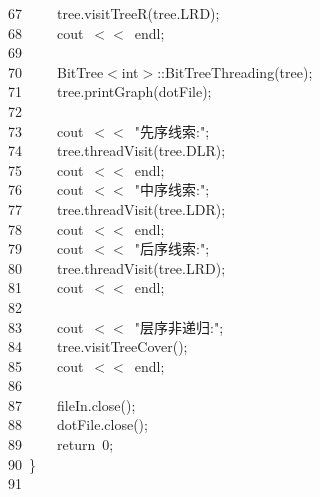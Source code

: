 \documentclass[11pt,a4paper]{ctexart}
\newcommand{\hlstd}[1]{\textcolor[rgb]{0.2,0.2,0.2}{#1}}
\newcommand{\hlnum}[1]{\textcolor[rgb]{0.06,0.58,0.63}{#1}}
\newcommand{\hlstr}[1]{\textcolor[rgb]{0.06,0.58,0.63}{#1}}
\newcommand{\hlopt}[1]{\textcolor[rgb]{0.2,0.2,0.2}{#1}}
\newcommand{\hllin}[1]{\textcolor[rgb]{0.59,0.59,0.59}{#1}}
\newcommand{\hlkwa}[1]{\textcolor[rgb]{0.23,0.42,0.78}{#1}}
\newcommand{\hlkwb}[1]{\textcolor[rgb]{0.63,0,0.31}{#1}}
\newcommand{\hlkwd}[1]{\textcolor[rgb]{0.78,0.23,0.41}{#1}}
\begin{document}
\hllin{67\ }\hlstd{}\hlstd{\ \ \ \ }\hlstd{tree}\hlopt{.}\hlstd{}\hlkwd{visitTreeR}\hlstd{}\hlopt{(}\hlstd{tree}\hlopt{.}\hlstd{LRD}\hlopt{);}\\
\hllin{68\ }\hlstd{}\hlstd{\ \ \ \ }\hlstd{cout\ }\hlopt{$<$$<$\ }\hlstd{endl}\hlopt{;}\\
\hllin{69\ }\hlstd{}\\
\hllin{70\ }\hlstd{}\hlstd{\ \ \ \ }\hlstd{BitTree}\hlopt{$<$}\hlstd{}\hlkwb{int}\hlstd{}\hlopt{$>$::}\hlstd{}\hlkwd{BitTreeThreading}\hlstd{}\hlopt{(}\hlstd{tree}\hlopt{);}\\
\hllin{71\ }\hlstd{}\hlstd{\ \ \ \ }\hlstd{tree}\hlopt{.}\hlstd{}\hlkwd{printGraph}\hlstd{}\hlopt{(}\hlstd{dotFile}\hlopt{);}\\
\hllin{72\ }\hlstd{}\\
\hllin{73\ }\hlstd{}\hlstd{\ \ \ \ }\hlstd{cout\ }\hlopt{$<$$<$\ }\hlstd{}\hlstr{"先序线索:"}\hlstd{}\hlopt{;}\\
\hllin{74\ }\hlstd{}\hlstd{\ \ \ \ }\hlstd{tree}\hlopt{.}\hlstd{}\hlkwd{threadVisit}\hlstd{}\hlopt{(}\hlstd{tree}\hlopt{.}\hlstd{DLR}\hlopt{);}\\
\hllin{75\ }\hlstd{}\hlstd{\ \ \ \ }\hlstd{cout\ }\hlopt{$<$$<$\ }\hlstd{endl}\hlopt{;}\\
\hllin{76\ }\hlstd{}\hlstd{\ \ \ \ }\hlstd{cout\ }\hlopt{$<$$<$\ }\hlstd{}\hlstr{"中序线索:"}\hlstd{}\hlopt{;}\\
\hllin{77\ }\hlstd{}\hlstd{\ \ \ \ }\hlstd{tree}\hlopt{.}\hlstd{}\hlkwd{threadVisit}\hlstd{}\hlopt{(}\hlstd{tree}\hlopt{.}\hlstd{LDR}\hlopt{);}\\
\hllin{78\ }\hlstd{}\hlstd{\ \ \ \ }\hlstd{cout\ }\hlopt{$<$$<$\ }\hlstd{endl}\hlopt{;}\\
\hllin{79\ }\hlstd{}\hlstd{\ \ \ \ }\hlstd{cout\ }\hlopt{$<$$<$\ }\hlstd{}\hlstr{"后序线索:"}\hlstd{}\hlopt{;}\\
\hllin{80\ }\hlstd{}\hlstd{\ \ \ \ }\hlstd{tree}\hlopt{.}\hlstd{}\hlkwd{threadVisit}\hlstd{}\hlopt{(}\hlstd{tree}\hlopt{.}\hlstd{LRD}\hlopt{);}\\
\hllin{81\ }\hlstd{}\hlstd{\ \ \ \ }\hlstd{cout\ }\hlopt{$<$$<$\ }\hlstd{endl}\hlopt{;}\\
\hllin{82\ }\hlstd{}\\
\hllin{83\ }\hlstd{}\hlstd{\ \ \ \ }\hlstd{cout\ }\hlopt{$<$$<$\ }\hlstd{}\hlstr{"层序非递归:"}\hlstd{}\hlopt{;}\\
\hllin{84\ }\hlstd{}\hlstd{\ \ \ \ }\hlstd{tree}\hlopt{.}\hlstd{}\hlkwd{visitTreeCover}\hlstd{}\hlopt{();}\\
\hllin{85\ }\hlstd{}\hlstd{\ \ \ \ }\hlstd{cout\ }\hlopt{$<$$<$\ }\hlstd{endl}\hlopt{;}\\
\hllin{86\ }\hlstd{}\\
\hllin{87\ }\hlstd{}\hlstd{\ \ \ \ }\hlstd{fileIn}\hlopt{.}\hlstd{}\hlkwd{close}\hlstd{}\hlopt{();}\\
\hllin{88\ }\hlstd{}\hlstd{\ \ \ \ }\hlstd{dotFile}\hlopt{.}\hlstd{}\hlkwd{close}\hlstd{}\hlopt{();}\\
\hllin{89\ }\hlstd{}\hlstd{\ \ \ \ }\hlstd{}\hlkwa{return\ }\hlstd{}\hlnum{0}\hlstd{}\hlopt{;}\\
\hllin{90\ }\hlstd{}\hlopt{\}}\\
\hllin{91\ }\hlstd{}\\
\mbox{}
\normalfont
\normalsize
\end{document}
